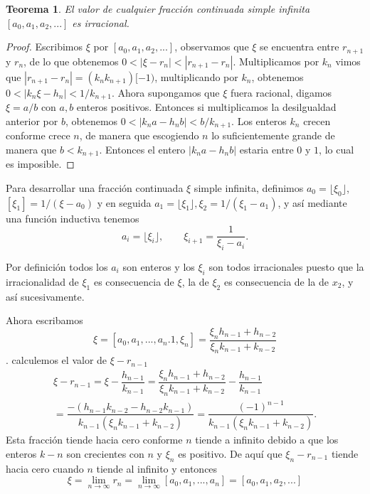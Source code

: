 \documentclass[11pt, article]{article}
\newtheorem{theorem}{Teorema} %
\begin{document}
    \begin{theorem}
        El valor de cualquier fracción continuada simple infinita $[a_0,a_1,a_2,...]$ es irracional.
    \end{theorem} 
    
    \begin{proof}
       Escribimos $\xi$ por $[a_0,a_1, a_2, ...]$, observamos que $\xi$ se encuentra entre $r_{n+1}$ y $r_n$, de lo que obtenemos $0<|\xi - r_n|<|r_{n+1}-r_n|$. Multiplicamos por $k_n$ vimos que $|r_{n+1}-r_n|=(k_nk_{n+1})[{-1})$, multiplicando por $k_n$, obtenemos $0<|k_n\xi-h_n|<1/k_{n+1}$.
       Ahora supongamos que $\xi$ fuera racional, digamos $\xi=a/b$ con $a,b$ enteros positivos. Entonces si multiplicamos la desilgualdad anterior por $b$, obtenemos $0<|k_na-h_nb|<b/k_{n+1}$.
       Los enteros $k_n$ crecen conforme crece $n$, de manera que escogiendo $n$ lo suficientemente grande de manera que $b<k_{n+1}$. Entonces el entero $|k_na-h_nb|$ estaria entre $0$ y $1$, lo cual es imposible.
    \end{proof}
        
    Para desarrollar una fracción continuada $\xi$ simple infinita, definimos $a_0=\lfloor \xi_0 \rfloor$, $[\xi_1]=1/(\xi-a_0)$ y en seguida $a_1= \lfloor \xi_1 \rfloor, \xi_2=1/(\xi_1-a_1)$, y así mediante una función inductiva tenemos
        \begin{equation}
        a_i=\lfloor \xi_i \rfloor, \qquad \xi_{i+1}=\dfrac{1}{\xi_i-a_i}.
        \label{ecuacion_1}
        \end{equation}

    Por definición todos los $a_i$ son enteros y los $\xi_i$ son todos irracionales puesto que la irracionalidad de $\xi_1$ es consecuencia de $\xi$, la de $\xi_2$ es consecuencia de la de $x_2$, y así sucesivamente. 
    
    Ahora escribamos 
    \[ 
    \xi=[a_0,a_1,...,a_n.1,\xi_n]=\dfrac{\xi_nh_{n-1}+h_{n-2}}{\xi_nk_{n-1}+k_{n-2}}
    \].
    calculemos el valor de $\xi-r_{n-1}$
    \begin{align*}
        \xi-r_{n-1}=\xi-\dfrac{h_{n-1}}{k_{n-1}}=\dfrac{\xi_nh_{n-1}+h_{n-2}}{\xi_nk_{n-1}+k_{n-2}}-\dfrac{h_{n-1}}{k_{n-1}}\\
        =\dfrac{-(h_{n-1}k_{n-2}-h_{n-2}k_{n-1})}{k_{n-1}(\xi_nk_{n-1}+k_{n-2})}=\dfrac{(-1)^{n-1}}{k_{n-1}(\xi_nk_{n-1}+k_{n-2})}.
    \end{align*}
    Esta fracción tiende hacia cero conforme $n$ tiende a infinito debido a que los enteros $k-n$ son crecientes con $n$ y $\xi_n$ es positivo. De aquí que $\xi_n-r_{n-1}$ tiende hacia cero cuando $n$ tiende al infinito y entonces
        \[
        \xi=\lim_{n\to\infty} r_n=\lim_{n\to\infty}[a_0,a_1,...,a_n]=[a_0,a_1,a_2,...]
        \]
        
\end{document}
